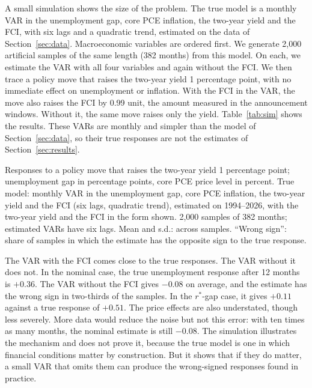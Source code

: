 \documentclass[11pt]{article}
\newcommand{\rs}{r^{*}}
\begin{document}
A small simulation shows the size of the problem. The true model is a monthly VAR in the unemployment gap, core PCE inflation, the two-year yield and the FCI, with six lags and a quadratic trend, estimated on the data of Section~\ref{sec:data}. Macroeconomic variables are ordered first. We generate 2,000 artificial samples of the same length (382 months) from this model. On each, we estimate the VAR with all four variables and again without the FCI. We then trace a policy move that raises the two-year yield 1 percentage point, with no immediate effect on unemployment or inflation. With the FCI in the VAR, the move also raises the FCI by 0.99 unit, the amount measured in the announcement windows. Without it, the same move raises only the yield. Table~\ref{tab:sim} shows the results. These VARs are monthly and simpler than the model of Section~\ref{sec:data}, so their true responses are not the estimates of Section~\ref{sec:results}.

\begin{table}[H]\centering\small
\caption{Simulation: estimating the effects of policy with and without financial conditions}\label{tab:sim}
{\setlength{\tabcolsep}{4pt}\resizebox{\ifdim\width>\linewidth\linewidth\else\width\fi}{!}{}}
\par\smallskip\begin{minipage}{0.95\textwidth}\footnotesize Responses to a policy move that raises the two-year yield 1 percentage point; unemployment gap in percentage points, core PCE price level in percent. True model: monthly VAR in the unemployment gap, core PCE inflation, the two-year yield and the FCI (six lags, quadratic trend), estimated on 1994--2026, with the two-year yield and the FCI in the form shown. 2,000 samples of 382 months; estimated VARs have six lags. Mean and s.d.: across samples. ``Wrong sign'': share of samples in which the estimate has the opposite sign to the true response.\end{minipage}
\end{table}

The VAR with the FCI comes close to the true responses. The VAR without it does not. In the nominal case, the true unemployment response after 12 months is $+0.36$. The VAR without the FCI gives $-0.08$ on average, and the estimate has the wrong sign in two-thirds of the samples. In the $\rs$-gap case, it gives $+0.11$ against a true response of $+0.51$. The price effects are also understated, though less severely. More data would reduce the noise but not this error: with ten times as many months, the nominal estimate is still $-0.08$. The simulation illustrates the mechanism and does not prove it, because the true model is one in which financial conditions matter by construction. But it shows that if they do matter, a small VAR that omits them can produce the wrong-signed responses found in practice.
\end{document}
